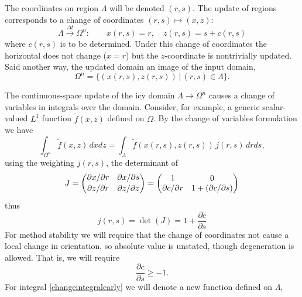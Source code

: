 \documentclass[letterpaper,final,12pt,reqno]{amsart}
\begin{document}
The coordinates on region $\Lambda$ will be denoted $(r,s)$.  The update of regions corresponds to a change of coordinates $(r,s) \mapsto (x,z)$:
\begin{equation}
\Lambda \stackrel{\Delta t}{\to} \Omega^n: \qquad x(r,s)=r, \quad z(r,s)=s+c(r,s) \label{changecoords}
\end{equation}
where $c(r,s)$ is to be determined.  Under this change of coordinates the horizontal does not change ($x=r$) but the $z$-coordinate is nontrivially updated.  Said another way, the updated domain an image of the input domain,
\begin{equation}
\Omega^n = \{(x(r,s),z(r,s)) \,\big|\, (r,s) \in \Lambda\}.  \label{updateddomain}
\end{equation}

The continuous-space update of the icy domain $\Lambda\to\Omega^n$ causes a change of variables in integrals over the domain.  Consider, for example, a generic scalar-valued $L^1$ function $\tilde f(x,z)$ defined on $\Omega$.  By the change of variables formulation we have
\begin{equation}
\int_{\Omega^n} \tilde f(x,z)\,dx dz = \int_\Lambda \tilde f(x(r,s),z(r,s)) \, j(r,s)\,dr ds, \label{changeintegralearly}
\end{equation}
using the weighting $j(r,s)$, the determinant of
\begin{equation}
J = \begin{pmatrix} \partial x / \partial r & \partial x / \partial s \\ {\large\strut} \partial z / \partial r & \partial z / \partial z \end{pmatrix} = \begin{pmatrix} 1 & 0 \\ \partial c/\partial r & 1+(\partial c/\partial s) \end{pmatrix} \label{jacchange}
\end{equation}
thus
\begin{equation}
j(r,s) = \det(J) = 1+\frac{\partial c}{\partial s}  \label{jacchangedet}
\end{equation}
For method stability we will require that the change of coordinates not cause a local change in orientation, so absolute value is unstated, though degeneration is allowed.  That is, we will require
\begin{equation}
\frac{\partial c}{\partial s} \ge -1.\label{differentialVI}
\end{equation}
For integral \eqref{changeintegralearly} we will denote a new function defined on $\Lambda$,
\end{document}
